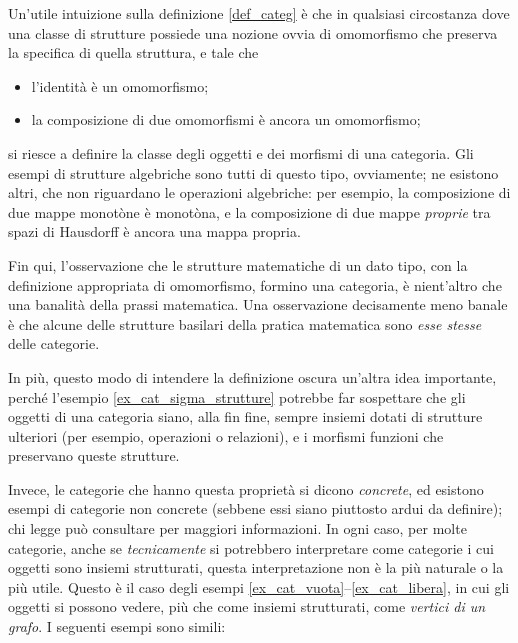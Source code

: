 Un'utile intuizione sulla definizione \ref{def_categ} è che in qualsiasi circostanza dove una classe di strutture possiede una nozione ovvia di omomorfismo che preserva la specifica di quella struttura, e tale che
\begin{itemize}
	\item l'identità è un omomorfismo;
	\item la composizione di due omomorfismi è ancora un omomorfismo;
\end{itemize}
si riesce a definire la classe degli oggetti e dei morfismi di una categoria. Gli esempi di strutture algebriche sono tutti di questo tipo, ovviamente; ne esistono altri, che non riguardano le operazioni algebriche: per esempio, la composizione di due mappe monotòne è monotòna, e la composizione di due mappe \emph{proprie} tra spazi di Hausdorff è ancora una mappa propria.

Fin qui, l'osservazione che le strutture matematiche di un dato tipo, con la definizione appropriata di omomorfismo, formino una categoria, è nient'altro che una banalità della prassi matematica. Una osservazione decisamente meno banale è che alcune delle strutture basilari della pratica matematica sono \emph{esse stesse} delle categorie.

In più, questo modo di intendere la definizione oscura un'altra idea importante, perché l'esempio \ref{ex_cat_sigma_strutture} potrebbe far sospettare che gli oggetti di una categoria siano, alla fin fine, sempre insiemi dotati di strutture ulteriori (per esempio, operazioni o relazioni), e i morfismi funzioni che preservano queste strutture.

Invece, le categorie che hanno questa proprietà si dicono \emph{concrete}, ed esistono esempi di categorie non concrete (sebbene essi siano piuttosto ardui da definire); chi legge può consultare \cite{Freyd1973,Kuera1971} per maggiori informazioni.
In ogni caso, per molte categorie, anche se \emph{tecnicamente} si potrebbero interpretare come categorie i cui oggetti sono insiemi strutturati, questa interpretazione non è la più naturale o la più utile. Questo è il caso degli esempi \ref{ex_cat_vuota}--\ref{ex_cat_libera}, in cui gli oggetti si possono vedere, più che come insiemi strutturati, come \emph{vertici di un grafo}.
I seguenti esempi sono simili:

